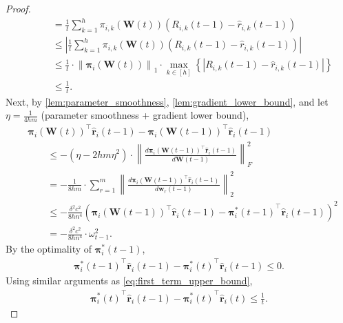 \documentclass[10pt]{article}
\def\rvr{{\mathbf{r}}}
\def\rvw{{\mathbf{w}}}
\def\rvpi{{\boldsymbol{\pi}}}
\def\rmW{{\mathbf{W}}}
\begin{document}
\begin{proof}
\begin{equation}
\begin{split}
    &\qquad = \frac{1}{t} \sum\limits_{k=1}^{h}{ \pi_{i,k}\left(\rmW(t)\right) \left( R_{i,k}(t-1) - \hat{r}_{i,k}(t-1) \right)} \\
    &\qquad \le \left| \frac{1}{t} \sum\limits_{k=1}^{h}{ \pi_{i,k}\left(\rmW(t)\right) \left( R_{i,k}(t-1) - \hat{r}_{i,k}(t-1) \right)} \right| \\
    &\qquad \le \frac{1}{t} \cdot \left\| \rvpi_{i}\left(\rmW(t)\right) \right\|_1 \cdot \max\limits_{k \in [h]}{\left\{ \left| R_{i,k}(t-1) - \hat{r}_{i,k}(t-1) \right| \right\}} \\
    &\qquad \le \frac{1}{t}.
\end{split}
\end{equation}
Next, by \cref{lem:parameter_smoothness}, \cref{lem:gradient_lower_bound}, and let $\eta = \frac{1}{4 h m}$ (parameter smoothness + gradient lower bound),
\begin{equation}
\label{eq:second_term_upper_bound}
\begin{split}
    &\rvpi_i\left(\rmW(t)\right)^\top \hat{\rvr}_i(t-1) - \rvpi_i\left(\rmW(t-1)\right)^\top \hat{\rvr}_i(t-1) \\
    &\qquad \le - \left( \eta - 2 h m \eta^2 \right) \cdot \left\| \frac{d \rvpi_i\left(\rmW(t-1)\right)^\top \hat{\rvr}_i(t-1) }{d \rmW(t-1)} \right\|_F^2 \\
    &\qquad = - \frac{1}{8 h m} \cdot \sum\limits_{r=1}^{m}{ \left\| \frac{d \rvpi_i\left(\rmW(t-1)\right)^\top \hat{\rvr}_i(t-1) }{d \rvw_r(t-1)} \right\|_2^2 } \\
    &\qquad \le - \frac{\delta^2 c^2}{8 h n^4} \left( \rvpi_i\left(\rmW(t-1)\right)^\top \hat{\rvr}_i(t-1) - {\rvpi_i^*(t-1)}^\top \hat{\rvr}_i(t-1) \right)^2 \\
    &\qquad = - \frac{\delta^2 c^2}{8 h n^4} \cdot \omega_{t-1}^2.
\end{split}    
\end{equation}
By the optimality of ${\rvpi_i^*(t-1)}$,
\begin{equation}
\label{eq:fourth_term_upper_bound}
\begin{split}
    {\rvpi_i^*(t-1)}^\top \hat{\rvr}_i(t-1) - {\rvpi_i^*(t)}^\top \hat{\rvr}_i(t-1) \le 0.
\end{split}
\end{equation}
Using similar arguments as \cref{eq:first_term_upper_bound},
\begin{equation}
\label{eq:fifth_term_upper_bound}
\begin{split}
    {\rvpi_i^*(t)}^\top \hat{\rvr}_i(t-1) - {\rvpi_i^*(t)}^\top \hat{\rvr}_i(t) \le \frac{1}{t}.

\end{split}
\end{equation}
\end{proof}
\end{document}
